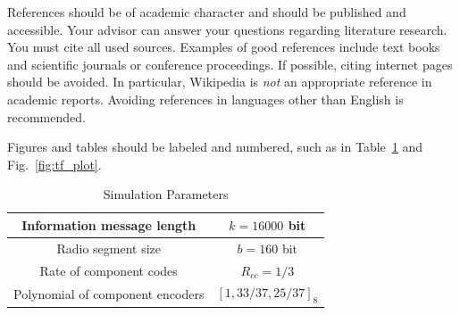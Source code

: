 \documentclass[journal, a4paper]{IEEEtran}
\begin{document}
	References should be of academic character and should be published and accessible.
	Your advisor can answer your questions regarding literature research.
	You must cite all used sources.
	Examples of good references include text books and scientific journals or conference proceedings.
	If possible, citing internet pages should be avoided. In particular, Wikipedia is \emph{not} an appropriate reference in academic reports.
	Avoiding references in languages other than English is recommended.

	Figures and tables should be labeled and numbered, such as in Table~\ref{tab:simParameters} and Fig.~\ref{fig:tf_plot}.

	\begin{table}[!hbt]
		\begin{center}
		\caption{Simulation Parameters}
		\label{tab:simParameters}
		\begin{tabular}{|c|c|}
			\hline
			Information message length & $k=16000$ bit \\
			\hline
			Radio segment size & $b=160$ bit \\
			\hline
			Rate of component codes & $R_{cc}=1/3$\\
			\hline
			Polynomial of component encoders & $[1 , 33/37 , 25/37]_8$\\
			\hline
		\end{tabular}
		\end{center}
	\end{table}

\end{document}
